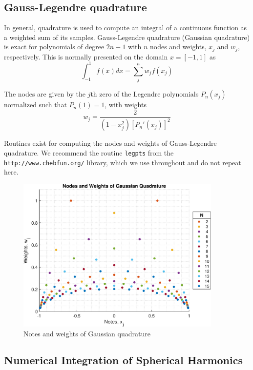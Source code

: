 \subsection{Gauss-Legendre quadrature}

In general, quadrature is used to compute an integral of a continuous function as a weighted sum of its samples. Gauss-Legendre quadrature (Gaussian quadrature) is exact for polynomials of degree $2n-1$ with $n$ nodes and weights, $x_j$ and $w_j$, respectively.  This is normally presented on the domain $x = [-1, 1]$ as 
\begin{equation}
\int_{-1}^{1} f(x) dx = \sum_j^n w_j f(x_j)
\end{equation}

The nodes are given by the $j$th zero of the Legendre polynomials $P_n(x_j)$ normalized such that $P_n(1) = 1$, with weights 
\begin{equation}
w_j = \dfrac{2}{(1-x_j^2)\left[P_n'(x_j) \right]^2}
\end{equation}

Routines exist for computing the nodes and weights of Gauss-Legendre quadrature. We recommend the routine \texttt{legpts} from the \texttt{http://www.chebfun.org/} library, which we use throughout and do not repeat here.

 \begin{figure}[H] 
   \centering
   \includegraphics[width=4in]{FastMultipoleMethod/Figures/gaussquad} 
   \caption{Notes and weights of Gaussian quadrature}
   \label{}
\end{figure}

\subsection{Numerical Integration of Spherical Harmonics}

